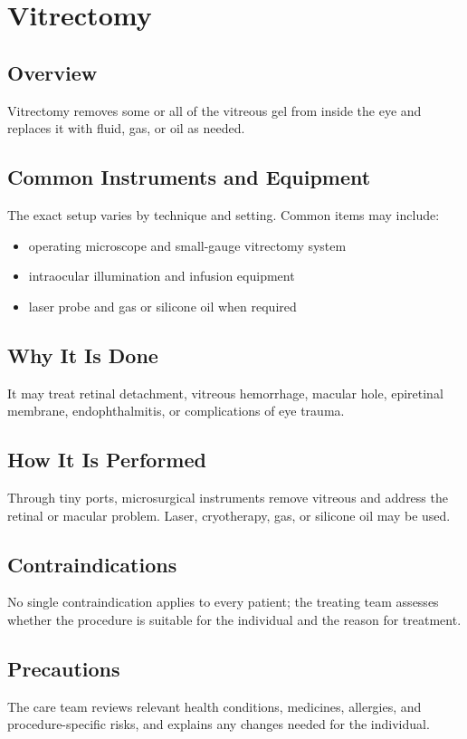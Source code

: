 \chapter{Vitrectomy}
\section*{Overview}
Vitrectomy removes some or all of the vitreous gel from inside the eye and replaces it with fluid, gas, or oil as needed.
\section*{Common Instruments and Equipment}
The exact setup varies by technique and setting. Common items may include:
\begin{itemize}[nosep,leftmargin=*]
  \item operating microscope and small-gauge vitrectomy system
  \item intraocular illumination and infusion equipment
  \item laser probe and gas or silicone oil when required
\end{itemize}

\section*{Why It Is Done}
It may treat retinal detachment, vitreous hemorrhage, macular hole, epiretinal membrane, endophthalmitis, or complications of eye trauma.
\section*{How It Is Performed}
Through tiny ports, microsurgical instruments remove vitreous and address the retinal or macular problem. Laser, cryotherapy, gas, or silicone oil may be used.
\section*{Contraindications}
No single contraindication applies to every patient; the treating team assesses whether the procedure is suitable for the individual and the reason for treatment.

\section*{Precautions}
The care team reviews relevant health conditions, medicines, allergies, and procedure-specific risks, and explains any changes needed for the individual.

